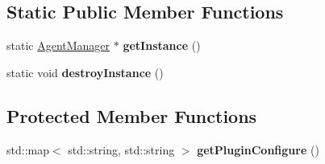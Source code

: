 \subsection*{Static Public Member Functions}
\begin{DoxyCompactItemize}
\item 
\mbox{\label{classcocos2d_1_1plugin_1_1AgentManager_a97ca7bbad6cdb6700b4b926a83ea5b9c}} 
static \hyperlink{classcocos2d_1_1plugin_1_1AgentManager}{Agent\+Manager} $\ast$ {\bfseries get\+Instance} ()
\item 
\mbox{\label{classcocos2d_1_1plugin_1_1AgentManager_a5f567271ab3945c66f9ca39346b571ac}} 
static void {\bfseries destroy\+Instance} ()
\end{DoxyCompactItemize}
\subsection*{Protected Member Functions}
\begin{DoxyCompactItemize}
\item 
\mbox{\label{classcocos2d_1_1plugin_1_1AgentManager_a0ef4da85d7a82cab47e329d659661a5f}} 
std\+::map$<$ std\+::string, std\+::string $>$ {\bfseries get\+Plugin\+Configure} ()
\end{DoxyCompactItemize}
